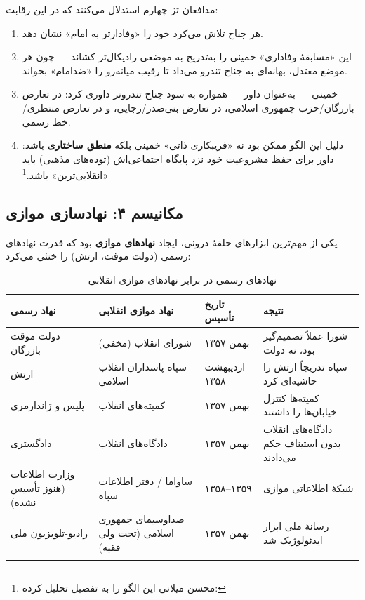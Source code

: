 \documentclass[12pt,a4paper]{book}
\newcommand{\keyword}[1]{\textbf{\textcolor{cPrimary}{#1}}}
\newcommand{\en}[1]{\lr{\textit{#1}}}
\begin{document}
مدافعان تز چهارم استدلال می‌کنند که در این رقابت:

\begin{enumerate}[label=\textcolor{cConsolid}{\bfseries\arabic*.}, rightmargin=2em]
    \item هر جناح تلاش می‌کرد خود را «وفادارتر به امام» نشان دهد.
    \item این «مسابقهٔ وفاداری» خمینی را به‌تدریج به موضعی رادیکال‌تر کشاند — چون هر موضع معتدل، بهانه‌ای به جناح تندرو می‌داد تا رقیب میانه‌رو را «ضدامام» بخواند.
    \item خمینی — به‌عنوان داور — همواره به سود جناح تندروتر داوری کرد: در تعارض بازرگان/حزب جمهوری اسلامی، در تعارض بنی‌صدر/رجایی، و در تعارض منتظری/خط رسمی.
    \item دلیل این الگو ممکن بود نه «فریبکاری ذاتی» خمینی بلکه \keyword{منطق ساختاری} باشد: داور برای حفظ مشروعیت خود نزد پایگاه اجتماعی‌اش (توده‌های مذهبی) باید «انقلابی‌ترین» باشد.\footnote{محسن میلانی این الگو را به تفصیل تحلیل کرده: \en{Milani (1994), pp.\,140--175.}}
\end{enumerate}

\subsection{مکانیسم ۴: نهادسازی موازی}

یکی از مهم‌ترین ابزارهای حلقهٔ درونی، ایجاد \keyword{نهادهای موازی} بود که قدرت نهادهای رسمی (دولت موقت، ارتش) را خنثی می‌کرد:

\begin{longtable}{%
    >{\raggedleft\arraybackslash}p{}
    >{\raggedleft\arraybackslash}p{}
    >{\raggedleft\arraybackslash}p{}
    >{\raggedleft\arraybackslash}p{}}
\toprule
\rowcolor{cConsolid!10}
\textbf{نهاد رسمی} & \textbf{نهاد موازی انقلابی} & \textbf{تاریخ تأسیس} & \textbf{نتیجه} \\
\midrule
\endhead

دولت موقت بازرگان &
شورای انقلاب (مخفی) &
بهمن ۱۳۵۷ &
شورا عملاً تصمیم‌گیر بود، نه دولت \\
\midrule

ارتش &
سپاه پاسداران انقلاب اسلامی &
اردیبهشت ۱۳۵۸ &
سپاه تدریجاً ارتش را حاشیه‌ای کرد \\
\midrule

پلیس و ژاندارمری &
کمیته‌های انقلاب &
بهمن ۱۳۵۷ &
کمیته‌ها کنترل خیابان‌ها را داشتند \\
\midrule

دادگستری &
دادگاه‌های انقلاب &
بهمن ۱۳۵۷ &
دادگاه‌های انقلاب بدون استیناف حکم می‌دادند \\
\midrule

وزارت اطلاعات (هنوز تأسیس نشده) &
ساواما / دفتر اطلاعات سپاه &
۱۳۵۸–۱۳۵۹ &
شبکهٔ اطلاعاتی موازی \\
\midrule

رادیو-تلویزیون ملی &
صداوسیمای جمهوری اسلامی (تحت ولی فقیه) &
بهمن ۱۳۵۷ &
رسانهٔ ملی ابزار ایدئولوژیک شد \\

\bottomrule
\caption{نهادهای رسمی در برابر نهادهای موازی انقلابی}
\label{tab:parallel-institutions}
\end{longtable}
\end{document}
